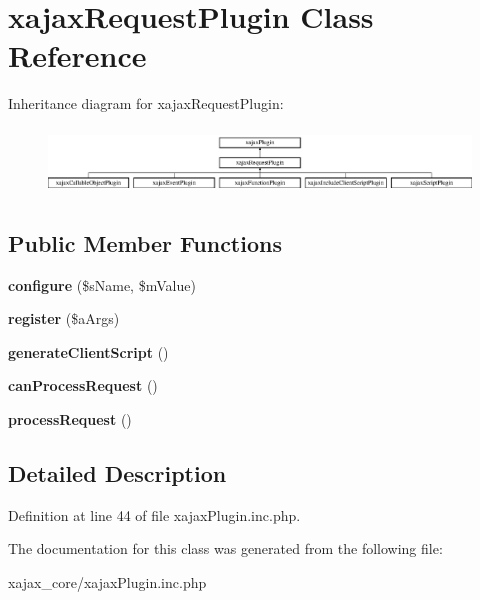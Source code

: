 \hypertarget{classxajaxRequestPlugin}{
\section{xajaxRequestPlugin Class Reference}
\label{classxajaxRequestPlugin}
}
Inheritance diagram for xajaxRequestPlugin:\begin{figure}[H]
\begin{center}
\leavevmode
\includegraphics[height=1.768421cm]{classxajaxRequestPlugin}
\end{center}
\end{figure}
\subsection*{Public Member Functions}
\begin{DoxyCompactItemize}
\item 
\hypertarget{classxajaxRequestPlugin_a9d0f92b3d778f87fa36a4ae38712e199}{
{\bfseries configure} (\$sName, \$mValue)}
\label{classxajaxRequestPlugin_a9d0f92b3d778f87fa36a4ae38712e199}

\item 
\hypertarget{classxajaxRequestPlugin_a366a077cd62ee653d2db7de24d333fae}{
{\bfseries register} (\$aArgs)}
\label{classxajaxRequestPlugin_a366a077cd62ee653d2db7de24d333fae}

\item 
\hypertarget{classxajaxRequestPlugin_a906830c648660d8ca0844417d3f7f9d2}{
{\bfseries generateClientScript} ()}
\label{classxajaxRequestPlugin_a906830c648660d8ca0844417d3f7f9d2}

\item 
\hypertarget{classxajaxRequestPlugin_a416b5c1ac4834bf8c51c1c22c9f6fd3a}{
{\bfseries canProcessRequest} ()}
\label{classxajaxRequestPlugin_a416b5c1ac4834bf8c51c1c22c9f6fd3a}

\item 
\hypertarget{classxajaxRequestPlugin_a4863655640204b9e7173eac759dea8a8}{
{\bfseries processRequest} ()}
\label{classxajaxRequestPlugin_a4863655640204b9e7173eac759dea8a8}

\end{DoxyCompactItemize}


\subsection{Detailed Description}


Definition at line 44 of file xajaxPlugin.inc.php.



The documentation for this class was generated from the following file:\begin{DoxyCompactItemize}
\item 
xajax\_\-core/xajaxPlugin.inc.php\end{DoxyCompactItemize}

